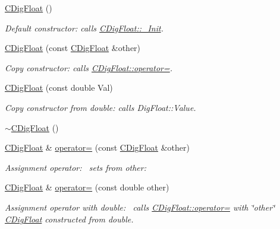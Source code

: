 \begin{DoxyCompactItemize}
\item 
\hyperlink{classCDigFloat_ac16694fac9b3b0350f5d02888638ae20}{C\+Dig\+Float} ()
\begin{DoxyCompactList}\small\item\em Default constructor\+: calls \hyperlink{classCDigFloat_a89a0dda21c74c115ac41b432031666a6}{C\+Dig\+Float\+::\+\_\+\+Init}. \end{DoxyCompactList}\item 
\hyperlink{classCDigFloat_a980c2c8c16275a8f838f2f7dc9b3670b}{C\+Dig\+Float} (const \hyperlink{classCDigFloat}{C\+Dig\+Float} \&other)
\begin{DoxyCompactList}\small\item\em Copy constructor\+: calls \hyperlink{classCDigFloat_a74f36566c2c79d7258b7b2dee35d46b2}{C\+Dig\+Float\+::operator=}. \end{DoxyCompactList}\item 
\hyperlink{classCDigFloat_a0ae24452dfb7838ec97a3998cd2b8f36}{C\+Dig\+Float} (const double Val)
\begin{DoxyCompactList}\small\item\em Copy constructor from double\+: calls Dig\+Float\+::\+Value. \end{DoxyCompactList}\item 
\hyperlink{classCDigFloat_adfee37b740660ebebcca8a088554e342}{$\sim$\+C\+Dig\+Float} ()
\item 
\hyperlink{classCDigFloat}{C\+Dig\+Float} \& \hyperlink{classCDigFloat_a74f36566c2c79d7258b7b2dee35d46b2}{operator=} (const \hyperlink{classCDigFloat}{C\+Dig\+Float} \&other)
\begin{DoxyCompactList}\small\item\em Assignment operator\+:~\newline
 sets from other\+: \end{DoxyCompactList}\item 
\hyperlink{classCDigFloat}{C\+Dig\+Float} \& \hyperlink{classCDigFloat_a6113b805767862e3e98fac9a3e10c7cd}{operator=} (const double other)
\begin{DoxyCompactList}\small\item\em Assignment operator with double\+:~\newline
 calls \hyperlink{classCDigFloat_a74f36566c2c79d7258b7b2dee35d46b2}{C\+Dig\+Float\+::operator=} with \char`\"{}other\char`\"{} \hyperlink{classCDigFloat}{C\+Dig\+Float} constructed from double. \end{DoxyCompactList}\item 

\end{DoxyCompactItemize}
